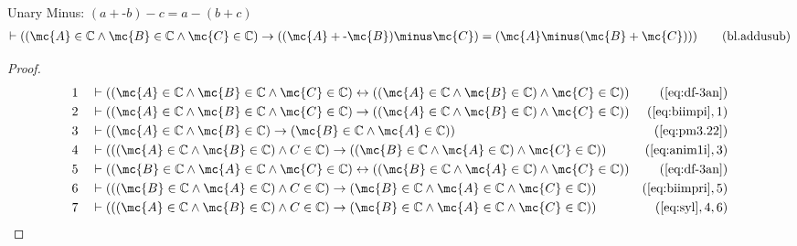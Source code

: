 \begin{lemma} {Unary Minus: $( a + \textrm{-} b )
\minus c = a \minus ( b + c )$}
\begin{align}
\vdash ( ( \mc{A} \in \mathbb{C} \wedge \mc{B} \in \mathbb{C} \wedge \mc{C} \in \mathbb{C} )
    \rightarrow ( ( \mc{A} + \textrm{-} \mc{B} ) \minus \mc{C} ) = ( \mc{A} \minus ( \mc{B} + \mc{C} ) )
    )\label{eq:bl.addusub}\tag{bl.addusub}
\end{align}
\end{lemma}


\begin{proof}
\begin{align}
  1 &&  & \vdash ( ( \mc{A} \in \mathbb{C} \wedge \mc{B} \in \mathbb{C} \wedge \mc{C} \in
    \mathbb{C} ) \leftrightarrow ( ( \mc{A} \in \mathbb{C}
    \wedge \mc{B} \in \mathbb{C} ) \wedge \mc{C} \in \mathbb{C} )
    )&(\mbox{\ref{eq:df-3an}})\notag
  \\ 2 &&  & \vdash ( ( \mc{A} \in \mathbb{C} \wedge \mc{B} \in \mathbb{C} \wedge \mc{C} \in
    \mathbb{C} ) \rightarrow ( ( \mc{A} \in \mathbb{C} \wedge
    \mc{B} \in \mathbb{C} ) \wedge \mc{C} \in \mathbb{C} )
    )&(\mbox{\ref{eq:biimpi}},1)\notag
  \\ 3 &&  & \vdash ( ( \mc{A} \in \mathbb{C} \wedge \mc{B} \in \mathbb{C} ) \rightarrow
    ( \mc{B} \in \mathbb{C} \wedge \mc{A} \in \mathbb{C} )
    )&(\mbox{\ref{eq:pm3.22}})\notag
  \\ 4 &&  & \vdash ( ( ( \mc{A} \in \mathbb{C} \wedge \mc{B} \in \mathbb{C} ) \wedge C
    \in \mathbb{C} ) \rightarrow ( ( \mc{B} \in \mathbb{C}
    \wedge \mc{A} \in \mathbb{C} ) \wedge \mc{C} \in \mathbb{C} )
    )&(\mbox{\ref{eq:anim1i}},3)\notag
  \\ 5 &&  & \vdash ( ( \mc{B} \in \mathbb{C} \wedge \mc{A} \in \mathbb{C} \wedge \mc{C} \in
    \mathbb{C} ) \leftrightarrow ( ( \mc{B} \in \mathbb{C}
    \wedge \mc{A} \in \mathbb{C} ) \wedge \mc{C} \in \mathbb{C} )
    )&(\mbox{\ref{eq:df-3an}})\notag
  \\ 6 &&  & \vdash ( ( ( \mc{B} \in \mathbb{C} \wedge \mc{A} \in \mathbb{C} ) \wedge C
    \in \mathbb{C} ) \rightarrow ( \mc{B} \in \mathbb{C}
    \wedge \mc{A} \in \mathbb{C} \wedge \mc{C} \in \mathbb{C} )
    )&(\mbox{\ref{eq:biimpri}},5)\notag
  \\ 7 &&  & \vdash ( ( ( \mc{A} \in \mathbb{C} \wedge \mc{B} \in \mathbb{C} ) \wedge C
    \in \mathbb{C} ) \rightarrow ( \mc{B} \in \mathbb{C}
    \wedge \mc{A} \in \mathbb{C} \wedge \mc{C} \in \mathbb{C} )
    )&(\mbox{\ref{eq:syl}},4,6)\notag

\end{align}
\end{proof}
